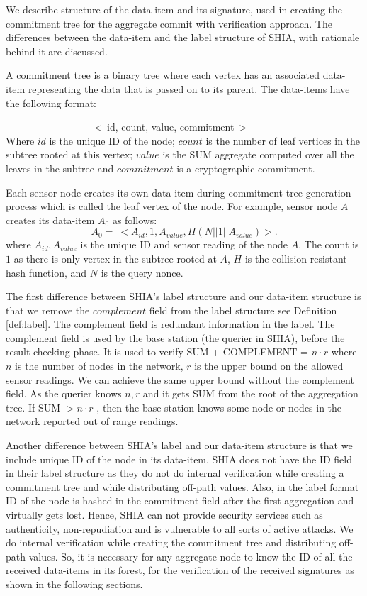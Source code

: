 	We describe structure of the data-item and its signature, used in creating the commitment tree for the aggregate commit with verification approach. 
	The differences between the data-item and the label structure of SHIA, with rationale behind it are discussed.
	\begin{definition}
		\label{def:data-item}
		A commitment tree is a binary tree where each vertex has an associated data-item representing the data that is passed on to its parent. The data-items have the following format:

		$\hspace{100pt}$ $<\ $id, count, value, commitment$\ >$\\
		Where $id$ is the unique ID of the node; $count$ is the number of leaf vertices in the subtree rooted at this vertex; $value$ is the SUM aggregate computed over all the leaves in the subtree and $commitment$ is a cryptographic commitment.
	\end{definition}
	Each sensor node creates its own data-item during commitment tree generation process which is called the leaf vertex of the node.
	For example, sensor node $A$ creates its data-item $A_{0}$ as follows:
	\begin{equation}
		\label{eq:data-item}
	 	A_{0} =\ <A_{id}, 1, A_{value}, H(N||1||A_{value})>.
	\end{equation}
	where $A_{id}, A_{value}$ is the unique ID and sensor reading of the node $A$. 
	The count is $1$ as there is only vertex in the subtree rooted at $A$, $H$ is the collision resistant hash function, and $N$ is the query nonce.

	The first difference between SHIA's label structure and our data-item structure is that we remove the $complement$ field from the label structure see Definition \ref{def:label}. 
	The complement field is redundant information in the label. 
	The complement field is used by the base station (the querier in SHIA), before the result checking phase.
	It is used to verify SUM + COMPLEMENT = $n \cdot r$ where $n$ is the number of nodes in the network, $r$ is the upper bound on the allowed sensor readings.
	We can achieve the same upper bound without the complement field.
	As the querier knows $n, r$ and it gets SUM from the root of the aggregation tree.
	If SUM $> n \cdot r$ , then the base station knows some node or nodes in the network reported out of range readings.

	Another difference between SHIA's label and our data-item structure is that we include unique ID of the node in its data-item.
	SHIA does not have the ID field in their label structure as they do not do internal verification while creating a commitment tree and while distributing off-path values.
	Also, in the label format ID of the node is hashed in the commitment field after the first aggregation and virtually gets lost.
	Hence, SHIA can not provide security services such as authenticity, non-repudiation and is vulnerable to all sorts of active attacks.
	We do internal verification while creating the commitment tree and distributing off-path values.
	So, it is necessary for any aggregate node to know the ID of all the received data-items in its forest, for the verification of the received signatures as shown in the following sections.

